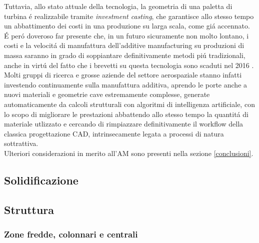 \documentclass{article}
\begin{document}
    Tuttavia, allo stato attuale della tecnologia, la geometria di una paletta di turbina é realizzabile tramite
    \textit{investment casting}, che garantisce allo stesso tempo un abbattimento dei costi in una produzione
    su larga scala, come giá accennato.\\ 

    É peró doveroso far presente che, in un futuro sicuramente non molto lontano, i costi e la velocitá di manufattura
    dell'additive manufacturing su produzioni di massa saranno in grado di soppiantare definitivamente metodi piú tradizionali,
    anche in virtú del fatto che i brevetti su questa tecnologia sono scaduti nel 2016 \autocite{Latvian_additive}. 
    Molti gruppi di ricerca e grosse aziende del settore aerospaziale
    stanno infatti investendo continuamente sulla manufattura additiva,
    aprendo le porte anche a nuovi materiali e geometrie cave estremamente complesse, 
    generate automaticamente da calcoli strutturali con algoritmi di intelligenza artificiale, 
    con lo scopo di migliorare le prestazioni abbattendo allo stesso
    tempo la quantitá di materiale utlizzato e 
    cercando di rimpiazzare definitivamente il workflow della classica progettazione CAD, 
    intrinsecamente legata a processi di natura sottrattiva. \\ 

    Ulteriori considerazioni in merito all'AM sono presenti nella sezione \ref{conclusioni}.



    

    \clearpage

        \subsection{Solidificazione\label{Casting_solid}}

        


        \clearpage
        \subsection{Struttura\label{Casting_strutt}}

            \subsubsection{Zone fredde, colonnari e centrali\label{Casting_strutt_zone}}
\end{document}
